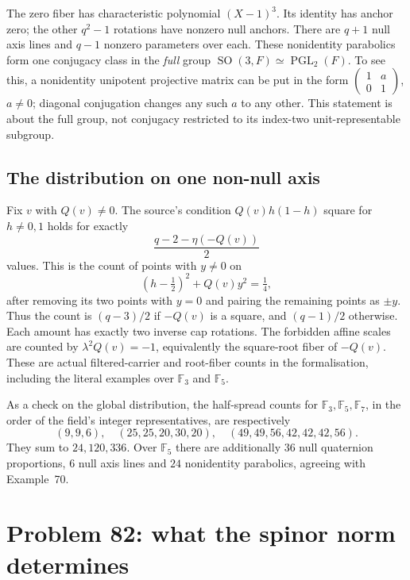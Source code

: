 \documentclass[11pt]{article}
\newcommand{\F}{\mathbb F}
\newcommand{\SO}{\operatorname{SO}}
\theoremstyle{remark}
\begin{document}
The zero fiber has characteristic polynomial \((X-1)^3\). Its identity
has anchor zero; the other \(q^2-1\) rotations have nonzero null anchors.
There are \(q+1\) null axis lines and \(q-1\) nonzero parameters over each.
These nonidentity parabolics form one conjugacy class in the \emph{full}
group \(\SO(3,F)\simeq\operatorname{PGL}_2(F)\). To see this, a nonidentity
unipotent projective matrix can be put in the form
\(\left(\begin{smallmatrix}1&a\\0&1\end{smallmatrix}\right)\),
\(a\ne0\); diagonal conjugation changes any such \(a\) to any other.
This statement is about the full group, not conjugacy restricted to its
index-two unit-representable subgroup.

\subsection{The distribution on one non-null axis}

Fix \(v\) with \(Q(v)\ne0\). The source's condition
\(Q(v)h(1-h)\) square for \(h\ne0,1\) holds for exactly
\begin{equation}
 \frac{q-2-\eta(-Q(v))}{2}
 \label{eq:axiscount}
\end{equation}
values. This is the count of points with \(y\ne0\) on
\[
 (h-\tfrac12)^2+Q(v)y^2=\tfrac14,
\]
after removing its two points with \(y=0\) and pairing the remaining
points as \(\pm y\). Thus the count is \((q-3)/2\) if \(-Q(v)\) is a
square, and \((q-1)/2\) otherwise. Each amount has exactly two inverse cap
rotations. The forbidden affine scales are counted by
\(\lambda^2Q(v)=-1\), equivalently the square-root fiber of \(-Q(v)\).
These are actual filtered-carrier and root-fiber counts in the formalisation,
including the literal examples over \(\F_3\) and \(\F_5\).

As a check on the global distribution, the half-spread counts for
\(\F_3,\F_5,\F_7\), in the order of the field's integer representatives,
are respectively
\[
 (9,9,6),\quad(25,25,20,30,20),\quad
 (49,49,56,42,42,42,56).
\]
They sum to \(24,120,336\). Over \(\F_5\) there are additionally
\(36\) null quaternion proportions, \(6\) null axis lines and \(24\)
nonidentity parabolics, agreeing with Example~70.

\section{Problem 82: what the spinor norm determines}
\end{document}
